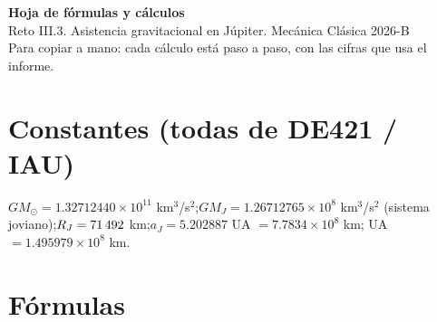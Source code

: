 \documentclass[11pt,letterpaper]{article}
\begin{document}
{\LARGE\bfseries Hoja de fórmulas y cálculos}\\[2pt]
Reto III.3. Asistencia gravitacional en Júpiter. Mecánica Clásica 2026-B\\
\small Para copiar a mano: cada cálculo está paso a paso, con las cifras que usa el informe.

\section*{Constantes (todas de DE421 / IAU)}
$GM_\odot=1.32712440\times10^{11}$ km$^3$/s$^2$;\quad $GM_J=1.26712765\times10^{8}$ km$^3$/s$^2$ (sistema joviano);\quad $R_J=71\,492$ km;\quad $a_J=5.202887$ UA $=7.7834\times10^{8}$ km; UA $=1.495979\times10^{8}$ km.

\section{Fórmulas}
\end{document}
